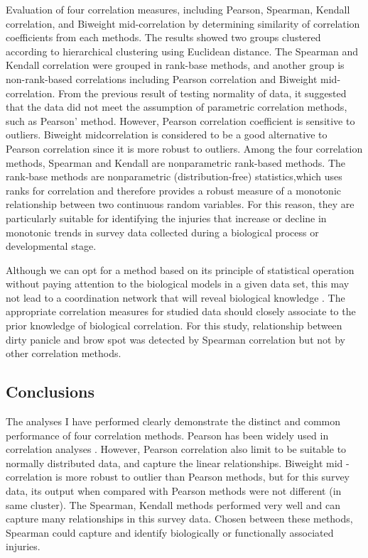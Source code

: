 Evaluation of four correlation measures, including Pearson, Spearman, Kendall correlation, and Biweight mid-correlation by determining similarity of correlation coefficients from each methods. The results showed two groups clustered according to hierarchical clustering using Euclidean distance. The Spearman and Kendall correlation were grouped in rank-base methods, and another group is non-rank-based correlations including Pearson correlation and Biweight mid-correlation. From the previous result of testing normality of data, it suggested that the data did not meet the assumption of parametric correlation methods, such as Pearson' method. However, Pearson correlation coefficient is sensitive to outliers. Biweight midcorrelation is considered to be a good alternative to Pearson correlation since it is more robust to outliers\citep{Wilcox_2012_Introduction}. Among the four correlation methods, Spearman and Kendall are nonparametric rank-based methods. The rank-base methods are nonparametric (distribution-free) statistics,which uses ranks for correlation and therefore provides a robust measure of a monotonic relationship between two continuous random variables. For this reason, they are particularly suitable for identifying the injuries that increase or decline in monotonic trends in survey data collected during a biological process or developmental stage.

Although we can opt for a method based on its principle of statistical operation without paying attention to the biological models in a given data set, this may not lead to a coordination network that will reveal biological knowledge \citep{Kumari_2012_Evaluation}. The appropriate correlation measures for studied data should closely associate to the prior knowledge of biological correlation. For this study, relationship between dirty panicle and brow spot was detected by Spearman correlation but not by other correlation methods.

\subsection{Conclusions}

The analyses I have performed clearly demonstrate the distinct and common performance of four correlation methods. Pearson has been widely used in correlation analyses \citep{Zhang_2005_General}. However, Pearson correlation also limit to be suitable to normally distributed data, and capture the linear relationships. Biweight mid -correlation is more robust to outlier than Pearson methods, but for this survey data, its output when compared with Pearson methods were not different (in same cluster). The Spearman, Kendall methods performed very well and can capture many relationships in this survey data. Chosen between these methods, Spearman could capture and identify biologically or functionally associated injuries.